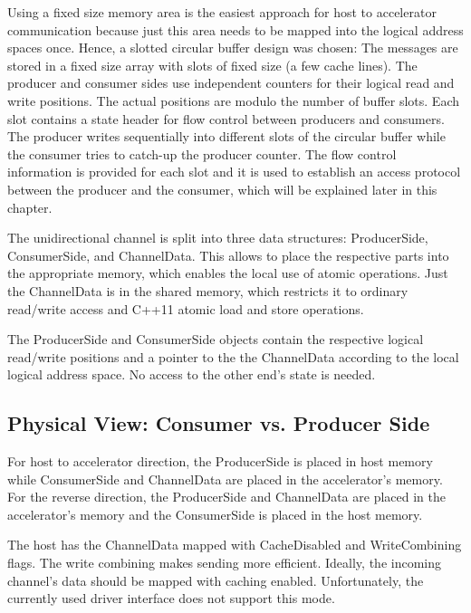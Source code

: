 Using a fixed size memory area is the easiest approach for host to accelerator
communication because just this area needs to be mapped into the logical address
spaces once. Hence, a slotted circular buffer design was chosen: The messages
are stored in a fixed size array with slots of fixed size (a few cache lines).
The producer and consumer sides use independent counters for their logical read
and write positions. The actual positions are modulo the number of buffer slots.
Each slot contains a state header for flow control between producers and
consumers. The producer writes sequentially into different slots of the circular
buffer while the consumer tries to catch-up the producer counter. The flow
control information is provided for each slot and it is used to establish an
access protocol between the producer and the consumer, which will be explained
later in this chapter.

The unidirectional channel is split into three data structures:
ProducerSide, ConsumerSide, and ChannelData. This allows to place the respective
parts into the appropriate memory, which enables the local use of atomic
operations. Just the ChannelData is in the shared memory, which restricts it to
ordinary read/write access and C++11 atomic load and store operations.

The ProducerSide and ConsumerSide objects contain the respective logical
read/write positions and a pointer to the the ChannelData according to the local
logical address space. No access to the other end's state is needed.

\subsection{Physical View: Consumer vs. Producer Side}

For host to accelerator direction, the ProducerSide is placed in host memory
while ConsumerSide and ChannelData are placed in the accelerator's memory. For
the reverse direction, the ProducerSide and ChannelData are placed in the
accelerator's memory and the ConsumerSide is placed in the host memory.

The host has the ChannelData mapped with CacheDisabled and
WriteCombining flags. The write combining makes sending more
efficient. Ideally, the incoming channel's data should be mapped with
caching enabled. 
Unfortunately, the currently used driver interface
does not support this mode.

